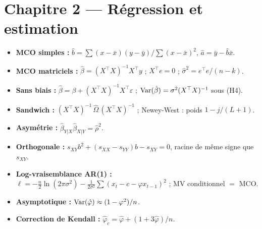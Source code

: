\section*{Chapitre 2 — Régression et estimation}
\begin{itemize}[leftmargin=1.2em,itemsep=0.05em]
\item \textbf{MCO simples :} $\hat b = \sum(x-\bar x)(y-\bar y)/\sum(x-\bar x)^2$, $\hat a = \bar y - \hat b\bar x$.
\item \textbf{MCO matriciels :} $\hat\beta = (X^\top X)^{-1}X^\top y$ ; $X^\top e = 0$ ; $\hat\sigma^2 = e^\top e/(n-k)$.
\item \textbf{Sans biais :} $\hat\beta = \beta + (X^\top X)^{-1}X^\top\varepsilon$ ; $\operatorname{Var}(\hat\beta) = \sigma^2(X^\top X)^{-1}$ sous (H4).
\item \textbf{Sandwich :} $(X^\top X)^{-1}\,\hat\Omega\,(X^\top X)^{-1}$ ; Newey-West : poids $1-j/(L+1)$.
\item \textbf{Asymétrie :} $\hat\beta_{Y|X}\hat\beta_{X|Y} = \hat\rho^2$.
\item \textbf{Orthogonale :} $s_{XY}b^2 + (s_{XX}-s_{YY})b - s_{XY} = 0$, racine de même signe que $s_{XY}$.
\item \textbf{Log-vraisemblance AR(1) :} $\ell = -\frac n2\ln(2\pi\sigma^2) - \frac1{2\sigma^2}\sum(x_t - c - \varphi x_{t-1})^2$ ; MV conditionnel $=$ MCO.
\item \textbf{Asymptotique :} $\operatorname{Var}(\hat\varphi)\approx(1-\varphi^2)/n$.
\item \textbf{Correction de Kendall :} $\hat\varphi_c = \hat\varphi + (1+3\hat\varphi)/n$.
\end{itemize}

